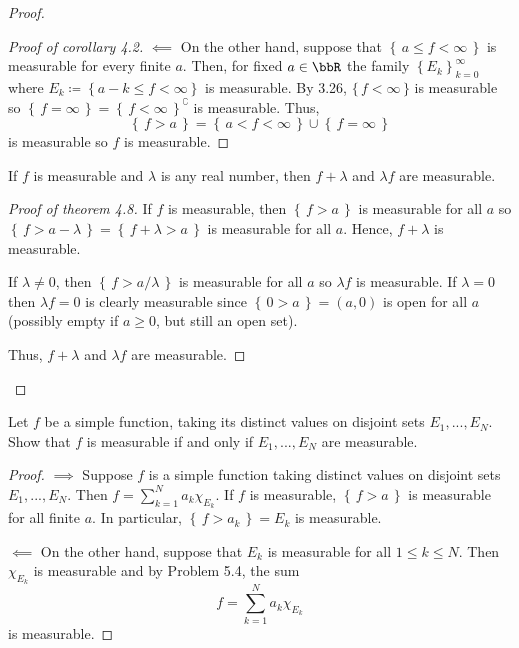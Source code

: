 \begin{proof}
\begin{proof}[Proof of corollary 4.2]
$\impliedby$ On the other hand, suppose that $\left\{\,a\leq
  f<\infty\,\right\}$ is measurable for every finite $a$. Then, for fixed
$a\in\bbR$ the family $\left\{E_k\right\}_{k=0}^\infty$ where
$E_k\coloneqq\left\{a-k\leq f<\infty\right\}$ is measurable. By 3.26,
$\{\,f<\infty\,\}$ is measurable so
$\left\{\,f=\infty\,\right\}=\left\{\,f<\infty\,\right\}^\complement$ is
measurable. Thus,
\[
\left\{\,f>a\,\right\}=\left\{\,a<f<\infty\,\right\}\cup\left\{\,f=\infty\,\right\}
\]
is measurable so $f$ is measurable.
\end{proof}
\begin{theorem*}
If $f$ is measurable and $\lambda$ is any real number, then $f+\lambda$ and
$\lambda f$ are measurable.
\end{theorem*}
\begin{proof}[Proof of theorem 4.8]
\renewcommand\qedsymbol{$\clubsuit$}
If $f$ is measurable, then $\left\{\,f>a\,\right\}$ is measurable for all
$a$ so $\left\{\,f>a-\lambda\,\right\}=\left\{\,f+\lambda>a\,\right\}$ is
measurable for all $a$. Hence, $f+\lambda$ is measurable.

If $\lambda\neq 0$, then $\left\{\,f>a/\lambda\,\right\}$ is measurable for
all $a$ so $\lambda f$ is measurable. If $\lambda=0$ then $\lambda f=0$ is
clearly measurable since $\left\{\,0>a\,\right\}=(a,0)$ is open for all
$a$ (possibly empty if $a\geq 0$, but still an open set).

Thus, $f+\lambda$ and $\lambda f$ are measurable.
\end{proof}
\end{proof}
\newpage

\begin{problem}
Let $f$ be a simple function, taking its distinct values on disjoint sets
$E_1,...,E_N$. Show that $f$ is measurable if and only if $E_1,...,E_N$ are
measurable.
\end{problem}
\begin{proof}
$\implies$ Suppose $f$ is a simple function taking distinct values on
disjoint sets $E_1,...,E_N$. Then $f=\sum_{k=1}^N a_k\chi_{E_k}$. If $f$ is
measurable, $\left\{\,f>a\,\right\}$ is measurable for all finite $a$. In
particular, $\left\{\,f>a_k\,\right\}=E_k$ is measurable.

$\impliedby$ On the other hand, suppose that $E_k$ is measurable for all
$1\leq k\leq N$. Then $\chi_{E_k}$ is measurable and by Problem 5.4, the
sum
\[
f=\sum_{k=1}^N a_k\chi_{E_k}
\]
is measurable.
\end{proof}

